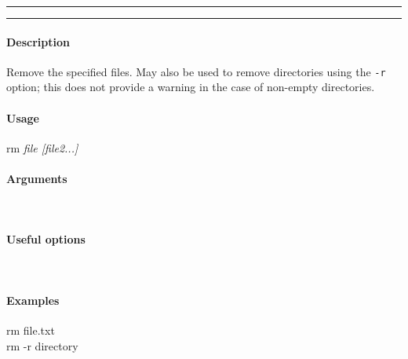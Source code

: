 \hrule
\vspace{1mm}
\hrule
\vspace{4mm}

\paragraph{Description}
\indentpar \raggedright \textrm{Remove the specified files. May also be used to remove directories using the \texttt{-r} option; this does not provide a warning in the case of non-empty directories.}\\

\paragraph{Usage}
\indentpar rm \textit{file [file2...]}

\paragraph{Arguments}
\indentpar {}\\
\indentpar {}

\paragraph{Useful options}
\indentpar {}\\
\indentpar {}

\paragraph{Examples}

\indentpar rm file.txt\\
\indentpar rm -r directory

\vspace{20mm}